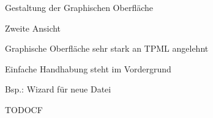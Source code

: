 



{
    \begin{itemgroup}{}
	\item Gestaltung der Graphischen Oberfläche
	\item Zweite Ansicht
	\end{itemgroup}
  
	\vfill{}
}

{
    \begin{itemgroup}{}
	\item Graphische Oberfläche sehr stark an TPML angelehnt
	\item Einfache Handhabung steht im Vordergrund
		\begin{itemgroup}{}
		\item Bsp.: Wizard für neue Datei
		\end{itemgroup}	
	\end{itemgroup}
  
	\vfill{}
}

{
    \begin{itemgroup}{}
	\item TODOCF
	\end{itemgroup}
  
	\vfill{}
}


